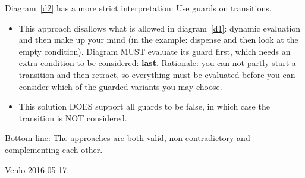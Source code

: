 Diagram~\ref{d2} has a more strict interpretation: Use guards on transitions.

\begin{itemize}
\item This approach disallows what is allowed in diagram~\ref{d1}: dynamic evaluation
and then make up your mind (in the example: dispense and then look at
the empty condition). Diagram MUST evaluate its guard first, which
needs an extra condition to be considered: \textbf{last}. Rationale:
you can not partly start a transition and then retract, so everything
must be evaluated before you can consider which of the guarded
variants you may choose. 
\item This solution DOES support all guards to be false, in which case the
transition is NOT considered.
\end{itemize}

\vspace{\baselineskip}
Bottom line: The approaches are both valid, non contradictory and
complementing each other.

Venlo 2016-05-17.




